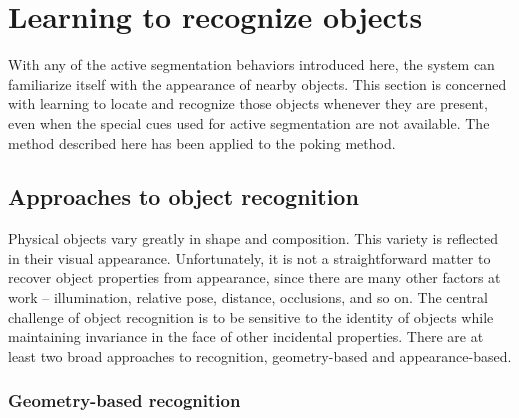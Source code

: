 

\section{Learning to recognize objects}

With any of the active segmentation behaviors introduced here, the
system can familiarize itself with the appearance of nearby objects.
This section is concerned with learning to locate and recognize those
objects whenever they are present, even when the special cues used for
active segmentation are not available.
%
The method described here has been applied to the poking method.

\subsection{Approaches to object recognition}

Physical objects vary greatly in shape and composition.  This variety
is reflected in their visual appearance.  Unfortunately, it is not a
straightforward matter to recover object properties from appearance,
since there are many other factors at work -- illumination, relative
pose, distance, occlusions, and so on.  The central challenge of
object recognition is to be sensitive to the identity of objects while
maintaining invariance in the face of other incidental properties.
%
There are at least two broad approaches to recognition, geometry-based
and appearance-based.

\subsubsection*{Geometry-based recognition}

